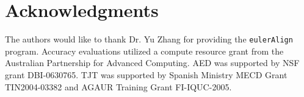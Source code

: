 \documentclass{ws-procs975x65}
\begin{document}
\section{ Acknowledgments }
The authors would like to thank Dr. Yu Zhang for providing the \texttt{eulerAlign} program.
Accuracy evaluations utilized a compute resource grant from the Australian Partnership for Advanced Computing.  AED was supported by NSF grant DBI-0630765. TJT was
supported by Spanish Ministry MECD Grant TIN2004-03382 and AGAUR
Training Grant FI-IQUC-2005.




\end{document}

